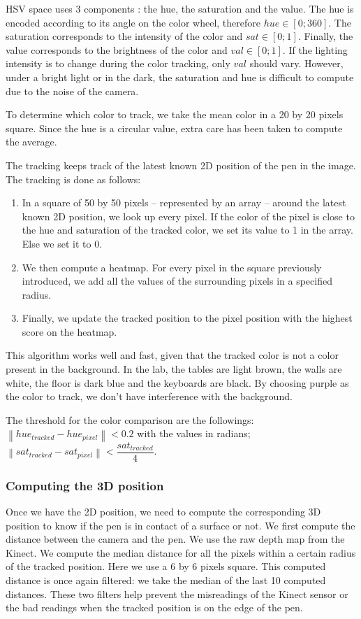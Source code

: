 \documentclass[12pt, twoside]{article}
\begin{document}
HSV space uses 3 components : the hue, the saturation and the value. The hue is encoded according to its angle on the color wheel, therefore $hue \in [0;360]$. The saturation corresponds to the intensity of the color and $sat \in [0;1]$. Finally, the value corresponds to the brightness of the color and $val \in [0;1]$. If the lighting intensity is to change during the color tracking, only $val$ should vary. However, under a bright light or in the dark, the saturation and hue is difficult to compute due to the noise of the camera.

To determine which color to track, we take the mean color in a 20 by 20 pixels square. Since the hue is a circular value, extra care has been taken to compute the average.

The tracking keeps track of the latest known 2D position of the pen in the image. The tracking is done as follows:
\begin{enumerate}
\item In a square of 50 by 50 pixels -- represented by an array -- around the latest known 2D position, we look up every pixel. If the color of the pixel is close to the hue and saturation of the tracked color, we set its value to 1 in the array. Else we set it to 0.
\item We then compute a heatmap. For every pixel in the square previously introduced, we add all the values of the surrounding pixels in a specified radius.
\item Finally, we update the tracked position to the pixel position with the highest score on the heatmap.
\end{enumerate}

This algorithm works well and fast, given that the tracked color is not a color present in the background. In the lab, the tables are light brown, the walls are white, the floor is dark blue and the keyboards are black. By choosing purple as the color to track, we don't have interference with the background.

The threshold for the color comparison are the followings: $\left\| hue_{tracked} - hue_{pixel}\right\| < 0.2$ with the values in radians; $\left\| sat_{tracked} - sat_{pixel}\right\| < \dfrac{sat_{tracked}}{4}$.

\subsubsection{Computing the 3D position}
Once we have the 2D position, we need to compute the corresponding 3D position to know if the pen is in contact of a surface or not. We first compute the distance between the camera and the pen. We use the raw depth map from the Kinect. We compute the median distance for all the pixels within a certain radius of the tracked position. Here we use a 6 by 6 pixels square. This computed distance is once again filtered: we take the median of the last 10 computed distances. These two filters help prevent the misreadings of the Kinect sensor or the bad readings when the tracked position is on the edge of the pen.
\end{document}
